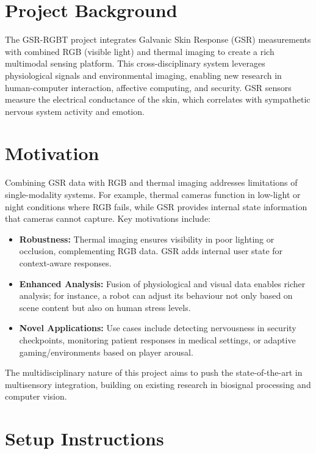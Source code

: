 \documentclass{article}
\begin{document}
    \section{Project Background}

    The GSR-RGBT project integrates Galvanic Skin Response (GSR) measurements with combined RGB (visible light) and thermal imaging to create a rich multimodal sensing platform. This cross-disciplinary system leverages physiological signals and environmental imaging, enabling new research in human-computer interaction, affective computing, and security. GSR sensors measure the electrical conductance of the skin, which correlates with sympathetic nervous system activity and emotion.


    \section{Motivation}

    Combining GSR data with RGB and thermal imaging addresses limitations of single-modality systems. For example, thermal cameras function in low-light or night conditions where RGB fails, while GSR provides internal state information that cameras cannot capture. Key motivations include:

    \begin{itemize}
        \item \textbf{Robustness:} Thermal imaging ensures visibility in poor lighting or occlusion, complementing RGB data. GSR adds internal user state for context-aware responses.
        \item \textbf{Enhanced Analysis:} Fusion of physiological and visual data enables richer analysis; for instance, a robot can adjust its behaviour not only based on scene content but also on human stress levels.
        \item \textbf{Novel Applications:} Use cases include detecting nervousness in security checkpoints, monitoring patient responses in medical settings, or adaptive gaming/environments based on player arousal.
    \end{itemize}

    The multidisciplinary nature of this project aims to push the state-of-the-art in multisensory integration, building on existing research in biosignal processing and computer vision.


    \section{Setup Instructions}
\end{document}
